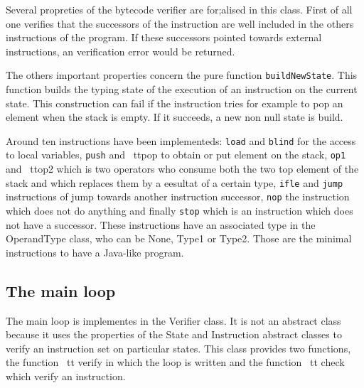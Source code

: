 Several propreties of the bytecode verifier are for;alised in this class.
First of all one verifies that the successors of the instruction are well included in the others instructions of the program. 
If these successors pointed towards external instructions, an verification error would be returned. 

The others important properties concern the pure function {\tt buildNewState}.
This function builds the typing state of the execution of an instruction  on the current state.
This construction can fail if the instruction tries for example to pop an element when the stack is empty.
If it succeeds, a new non null state is build.

Around ten instructions have been implementeds:  {\tt load} and {\tt blind} for the access to local variables, {\tt push} and {\ ttpop}   to obtain or put element on the stack, {\tt op1} and {\ ttop2} which is two operators who consume both the two top element of the stack and which replaces them by a eesultat of a certain type, {\tt ifle} and {\tt jump} instructions of jump towards another instruction successor, {\tt nop}  the instruction which does not do anything   and finally {\tt stop} which is an instruction which does not have a successor.
These instructions have an associated type in the OperandType class,
who can be None, Type1 or Type2.  Those are the minimal instructions to have a Java-like program.  
\subsection {The main loop}
The main loop is implementes in the Verifier class.
It is not an abstract class because it uses the properties of the State and Instruction abstract classes  to verify an instruction set on particular states.
This class provides two functions, the function  {\ tt verify} in which the loop is written and the function {\ tt check} which verify an instruction.


